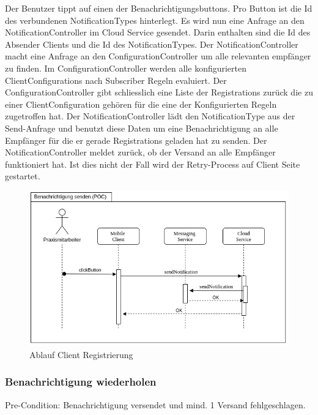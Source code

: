 Der Benutzer tippt auf einen der Benachrichtigungsbuttons.
Pro Button ist die Id des verbundenen NotificationTypes hinterlegt.
Es wird nun eine Anfrage an den NotificationController im Cloud Service gesendet.
Darin enthalten sind die Id des Absender Clients und die Id des NotificationTypes.
Der NotificationController macht eine Anfrage an den ConfigurationController um alle relevanten empfänger zu finden.
Im ConfigurationController werden alle konfigurierten ClientConfigurations nach Subscriber Regeln evaluiert.
Der ConfigurationController gibt schliesslich eine Liste der Registrations zurück die zu einer ClientConfiguration gehören für die eine der Konfigurierten Regeln zugetroffen hat.
Der NotificationController lädt den NotificationType aus der Send-Anfrage und benutzt diese Daten um eine Benachrichtigung an alle Empfänger für die er gerade Registrations geladen hat zu senden.
Der NotificationController meldet zurück, ob der Versand an alle Empfänger funktioniert hat.
Ist dies nicht der Fall wird der Retry-Process auf Client Seite gestartet.

\begin{figure}[h]
    \centering
    \begin{minipage}[b]{1.0\textwidth}
        \includegraphics[width=\textwidth]{graphics/Sequence_POC_Send}
        \caption{Ablauf Client Registrierung}
    \end{minipage}
\end{figure}


\subsubsection*{Benachrichtigung wiederholen}

Pre-Condition: Benachrichtigung versendet und mind. 1 Versand fehlgeschlagen.

